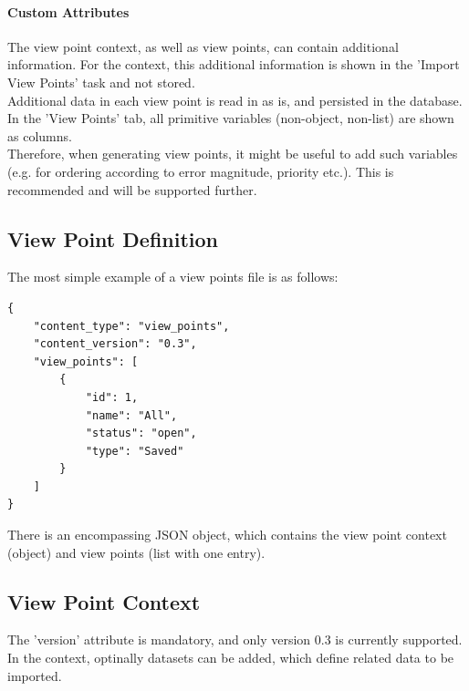 \paragraph{Custom Attributes}
\label{sec:view_points_custom_attributes} 

The view point context, as well as view points, can contain additional information. For the context, this additional information is shown in the 'Import View Points' task and not stored. \\

Additional data in each view point is read in as is, and persisted in the database. In the 'View Points' tab, all primitive variables (non-object, non-list) are shown as columns. \\

Therefore, when generating view points, it might be useful to add such variables (e.g. for ordering according to error magnitude, priority etc.). This is recommended and will be supported further. \\
 
\subsection{View Point Definition}
 
The most simple example of a view points file is as follows:

\begin{lstlisting}[basicstyle=\small\ttfamily]
{
    "content_type": "view_points",
    "content_version": "0.3",
    "view_points": [
        {
            "id": 1,
            "name": "All",
            "status": "open",
            "type": "Saved"
        }
    ]
}
\end{lstlisting}

There is an encompassing JSON object, which contains the view point context (object) and view points (list with one entry). \\

\subsection{View Point Context}

The 'version' attribute is mandatory, and only version 0.3 is currently supported. \\

In the context, optinally datasets can be added, which define related data to be imported.


